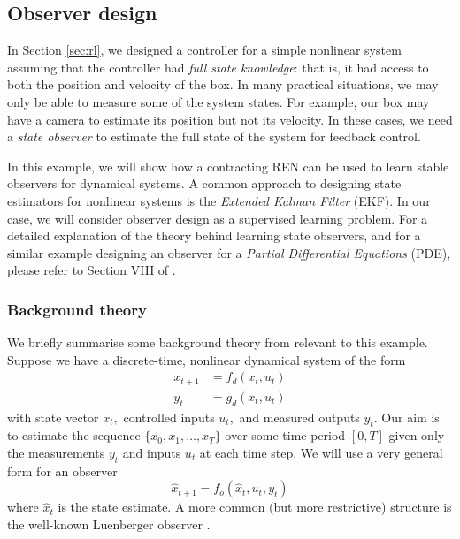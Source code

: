 \subsection{Observer design} \label{sec:observer}

In Section \ref{sec:rl}, we designed a controller for a simple nonlinear system assuming that the controller had \textit{full state knowledge}: that is, it had access to both the position and velocity of the box. In many practical situations, we may only be able to measure some of the system states. For example, our box may have a camera to estimate its position but not its velocity. In these cases, we need a \textit{state observer} to estimate the full state of the system for feedback control.

In this example, we will show how a contracting REN can be used to learn stable observers for dynamical systems. A common approach to designing state estimators for nonlinear systems is the \textit{Extended Kalman Filter} (EKF). In our case, we will consider observer design as a supervised learning problem. For a detailed explanation of the theory behind learning state observers, and for a similar example designing an observer for a \textit{Partial Differential Equations} (PDE), please refer to Section VIII of \cite{Revay++2023}.

\subsubsection{Background theory} \label{sec:observer-theory}

We briefly summarise some background theory from \cite{Revay++2023} relevant to this example. Suppose we have a discrete-time, nonlinear dynamical system of the form
\begin{align}
    x_{t+1} &= f_d(x_t, u_t) \\
    y_t &= g_d(x_t, u_t)
\end{align}
with state vector $x_t,$ controlled inputs $u_t,$ and measured outputs $y_t.$ Our aim is to estimate the sequence $\{x_0, x_1, \ldots, x_T \}$ over some time period $[0,T]$ given only the measurements $y_t$ and inputs $u_t$ at each time step. We will use a very general form for an observer
\begin{equation}
    \hat{x}_{t+1} = f_o(\hat{x}_t, u_t, y_t)
\end{equation}
where $\hat{x}_t$ is the state estimate. A more common (but more restrictive) structure is the well-known Luenberger observer \cite{Luenberger1971}.

